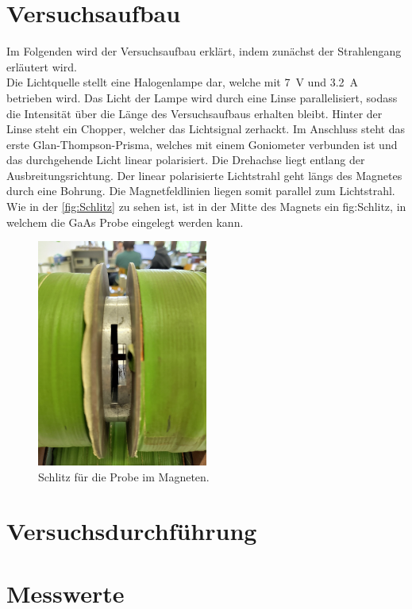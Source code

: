 


\section{Versuchsaufbau}
Im Folgenden wird der Versuchsaufbau erklärt, indem zunächst der Strahlengang erläutert wird.\\
Die Lichtquelle stellt eine Halogenlampe dar, welche mit \qty{7}{\volt} und \qty{3.2}{\ampere} betrieben wird.
Das Licht der Lampe wird durch eine Linse parallelisiert, sodass die Intensität über die Länge des Versuchsaufbaus erhalten bleibt. 
Hinter der Linse steht ein Chopper, welcher das Lichtsignal zerhackt. Im Anschluss steht das erste Glan-Thompson-Prisma, welches mit 
einem Goniometer verbunden ist und das durchgehende Licht linear polarisiert. Die Drehachse liegt entlang der Ausbreitungsrichtung. 
Der linear polarisierte Lichtstrahl geht längs des Magnetes durch eine Bohrung. Die Magnetfeldlinien liegen somit parallel zum 
Lichtstrahl. Wie in der \autoref{fig:Schlitz} zu sehen ist, ist in der Mitte des Magnets ein fig:Schlitz, in welchem die GaAs Probe eingelegt 
werden kann.

\begin{figure}
    \includegraphics[width=0.5\textwidth]{Schlitz.jpg}
    \caption{Schlitz für die Probe im Magneten.}
    \label{fig:Schlitz}
\end{figure}


\section{Versuchsdurchführung}

\section{Messwerte}



